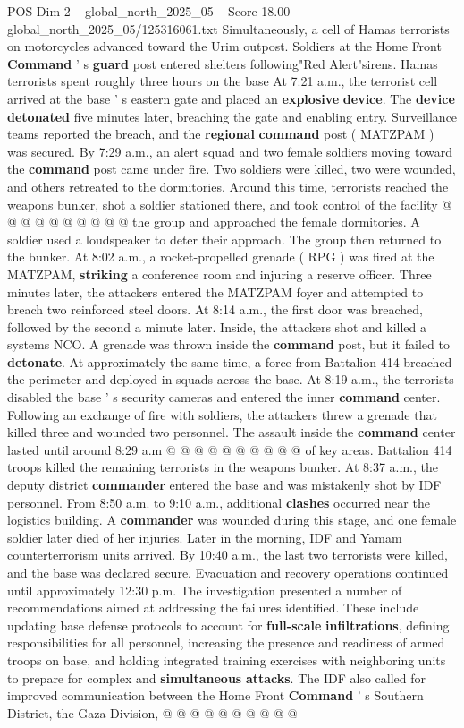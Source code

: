 \begin{textsample}{POS Dim 2 – global\_north\_2025\_05 – Score 18.00 – global\_north\_2025\_05/125316061.txt}
Simultaneously, a cell of Hamas terrorists on motorcycles advanced toward the Urim outpost.
Soldiers at the Home Front \textbf{Command} ' s \textbf{guard} post entered shelters following"Red Alert"sirens.
Hamas terrorists spent roughly three hours on the base At 7:21 a.m., the terrorist cell arrived at the base ' s eastern gate and placed an \textbf{explosive} \textbf{device}.
The \textbf{device} \textbf{detonated} five minutes later, breaching the gate and enabling entry.
Surveillance teams reported the breach, and the \textbf{regional} \textbf{command} post ( MATZPAM ) was secured.
By 7:29 a.m., an alert squad and two female soldiers moving toward the \textbf{command} post came under fire.
Two soldiers were killed, two were wounded, and others retreated to the dormitories.
Around this time, terrorists reached the weapons bunker, shot a soldier stationed there, and took control of the facility @ @ @ @ @ @ @ @ @ @ the group and approached the female dormitories.
A soldier used a loudspeaker to deter their approach.
The group then returned to the bunker.
At 8:02 a.m., a rocket-propelled grenade ( RPG ) was fired at the MATZPAM, \textbf{striking} a conference room and injuring a reserve officer.
Three minutes later, the attackers entered the MATZPAM foyer and attempted to breach two reinforced steel doors.
At 8:14 a.m., the first door was breached, followed by the second a minute later.
Inside, the attackers shot and killed a systems NCO.
A grenade was thrown inside the \textbf{command} post, but it failed to \textbf{detonate}.
At approximately the same time, a force from Battalion 414 breached the perimeter and deployed in squads across the base.
At 8:19 a.m., the terrorists disabled the base ' s security cameras and entered the inner \textbf{command} center.
Following an exchange of fire with soldiers, the attackers threw a grenade that killed three and wounded two personnel.
The assault inside the \textbf{command} center lasted until around 8:29 a.m @ @ @ @ @ @ @ @ @ @ of key areas.
Battalion 414 troops killed the remaining terrorists in the weapons bunker.
At 8:37 a.m., the deputy district \textbf{commander} entered the base and was mistakenly shot by IDF personnel.
From 8:50 a.m. to 9:10 a.m., additional \textbf{clashes} occurred near the logistics building.
A \textbf{commander} was wounded during this stage, and one female soldier later died of her injuries.
Later in the morning, IDF and Yamam counterterrorism units arrived.
By 10:40 a.m., the last two terrorists were killed, and the base was declared secure.
Evacuation and recovery operations continued until approximately 12:30 p.m.
The investigation presented a number of recommendations aimed at addressing the failures identified.
These include updating base defense protocols to account for \textbf{full-scale} \textbf{infiltrations}, defining responsibilities for all personnel, increasing the presence and readiness of armed troops on base, and holding integrated training exercises with neighboring units to prepare for complex and \textbf{simultaneous} \textbf{attacks}.
The IDF also called for improved communication between the Home Front \textbf{Command} ' s Southern District, the Gaza Division, @ @ @ @ @ @ @ @ @ @


\end{textsample}
